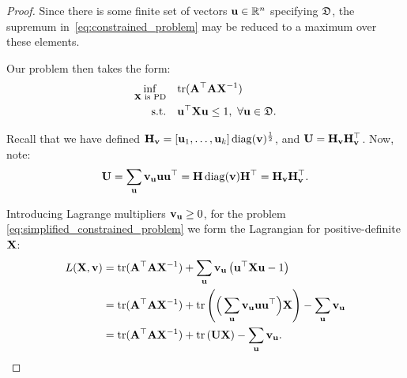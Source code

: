 \begin{proof}

Since there is some finite set of vectors $\mathbf{u} \in \mathbb{R}^n$ specifying $\mathfrak{D}$, the supremum in~\cref{eq:constrained_problem} may be reduced to a maximum over these elements.%

Our problem then takes the form:
\begin{align}\label{eq:simplified_constrained_problem}
    \inf_{\mathbf{X} \text{ is PD}} \quad &\mathrm{tr}(\mathbf{A}^\top\mathbf{A} \mathbf{X}^{-1}) \notag \\
    \text{s.t.} \quad & \mathbf{u}^\top \mathbf{X} \mathbf{u} \le 1, \ \forall \mathbf{u} \in \mathfrak{D}.
\end{align}

Recall that we have defined
$\mathbf{H}_{\mathbf{v}} = [\mathbf{u}_1, \dots, \mathbf{u}_k] \operatorname{diag}(\mathbf{v})^\frac{1}{2}$, and $\mathbf{U} = \mathbf{H}_{\mathbf{v}}\mathbf{H}_{\mathbf{v}}^\top$. Now, note:
 \begin{equation}\label{eq:Udef}
  \mathbf{U} = \sum_{\mathbf{u}} \mathbf{v}_{\mathbf{u}} \mathbf{u} \mathbf{u}^\top 
  = \mathbf{H} \operatorname{diag}(\mathbf{v}) \mathbf{H}^\top = \mathbf{H}_{\mathbf{v}} \mathbf{H}_{\mathbf{v}}^\top.
\end{equation}

Introducing Lagrange multipliers $\mathbf{v}_{\mathbf{u}} \ge 0$, for the problem \cref{eq:simplified_constrained_problem} we form the Lagrangian for positive-definite $\mathbf{X}$:
\begin{align}
  L(\mathbf{X}, \mathbf{v}) 
  &= \mathrm{tr}(\mathbf{A}^\top\mathbf{A}\mathbf{X}^{-1})
     + \sum_{\mathbf{u}} \mathbf{v}_{\mathbf{u}} \left(\mathbf{u}^\top \mathbf{X} \mathbf{u} - 1\right) \\
  &= \mathrm{tr}(\mathbf{A}^\top\mathbf{A}\mathbf{X}^{-1})
      + \mathrm{tr} \left( \Big(\sum_{\mathbf{u}} \mathbf{v}_{\mathbf{u}} \mathbf{u} \mathbf{u}^\top\Big) \mathbf{X} \right)
      - \sum_{\mathbf{u}} \mathbf{v}_{\mathbf{u}} \\
   &= \mathrm{tr}(\mathbf{A}^\top\mathbf{A}\mathbf{X}^{-1})
      + \mathrm{tr} \left( \mathbf{U} \mathbf{X} \right) - \sum_{\mathbf{u}} \mathbf{v}_{\mathbf{u}}. \label{eq:genL}
\end{align}



\end{proof}
